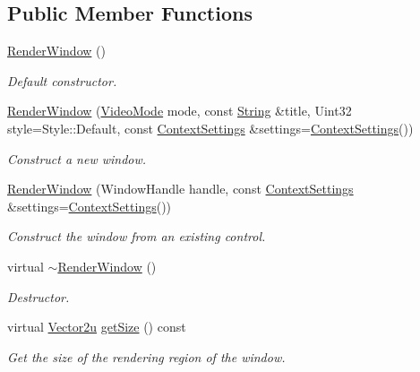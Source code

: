\subsection*{Public Member Functions}
\begin{DoxyCompactItemize}
\item 
\mbox{\hyperlink{classsf_1_1_render_window_a839bbf336bdcafb084dafc3076fc9021}{Render\+Window}} ()
\begin{DoxyCompactList}\small\item\em Default constructor. \end{DoxyCompactList}\item 
\mbox{\hyperlink{classsf_1_1_render_window_aebef983e01f677bf5a66cefc4d547647}{Render\+Window}} (\mbox{\hyperlink{classsf_1_1_video_mode}{Video\+Mode}} mode, const \mbox{\hyperlink{classsf_1_1_string}{String}} \&title, Uint32 style=Style\+::\+Default, const \mbox{\hyperlink{structsf_1_1_context_settings}{Context\+Settings}} \&settings=\mbox{\hyperlink{structsf_1_1_context_settings}{Context\+Settings}}())
\begin{DoxyCompactList}\small\item\em Construct a new window. \end{DoxyCompactList}\item 
\mbox{\hyperlink{classsf_1_1_render_window_a25c0af7d515e710b6eebc9c6be952aa5}{Render\+Window}} (Window\+Handle handle, const \mbox{\hyperlink{structsf_1_1_context_settings}{Context\+Settings}} \&settings=\mbox{\hyperlink{structsf_1_1_context_settings}{Context\+Settings}}())
\begin{DoxyCompactList}\small\item\em Construct the window from an existing control. \end{DoxyCompactList}\item 
virtual \mbox{\hyperlink{classsf_1_1_render_window_a3407e36bfc1752d723140438a825365c}{$\sim$\+Render\+Window}} ()
\begin{DoxyCompactList}\small\item\em Destructor. \end{DoxyCompactList}\item 
virtual \mbox{\hyperlink{classsf_1_1_vector2}{Vector2u}} \mbox{\hyperlink{classsf_1_1_render_window_ae3eacf93661c8068fca7a78d57dc7e14}{get\+Size}} () const
\begin{DoxyCompactList}\small\item\em Get the size of the rendering region of the window. \end{DoxyCompactList}\item 

\end{DoxyCompactItemize}

